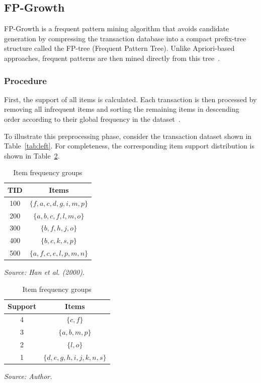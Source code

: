 \subsection{FP-Growth}

FP-Growth is a frequent pattern mining algorithm that avoids candidate generation by compressing the transaction database into a compact prefix-tree structure called the FP-tree (Frequent Pattern Tree). Unlike Apriori-based approaches, frequent patterns are then mined directly from this tree~\parencite{Han2000Mining}.

\subsubsection{Procedure}

First, the support of all items is calculated. Each transaction is then processed by removing all infrequent items and sorting the remaining items in descending order according to their global frequency in the dataset~\parencite{Han2000Mining}.

To illustrate this preprocessing phase, consider the transaction dataset shown in Table~\ref{tab:left}. For completeness, the corresponding item support distribution is shown in Table~\ref{tab:right}.

\begin{table}[h!]
\centering
\begin{minipage}{0.48\textwidth}
\centering
\caption{Transaction dataset}
\label{tab:left}
\begin{tabular}{|c|c|}
\hline
\textbf{TID} & \textbf{Items} \\
\hline
100 & $\{f, a, c, d, g, i, m, p\}$ \\
200 & $\{a, b, c, f, l, m, o\}$ \\
300 & $\{b, f, h, j, o\}$ \\
400 & $\{b, c, k, s, p\}$ \\
500 & $\{a, f, c, e, l, p, m, n\}$ \\
\hline
\end{tabular}
\vspace{0.2cm}
\parbox{0.9\textwidth}{\centering \textit{Source: Han et al. (2000).}}
\end{minipage}
\hfill
\begin{minipage}{0.48\textwidth}
\centering
\caption{Item frequency groups}
\label{tab:right}
\begin{tabular}{|c|c|}
\hline
\textbf{Support} & \textbf{Items} \\
\hline
4 & $\{c, f\}$ \\
3 & $\{a, b, m, p\}$ \\
2 & $\{l, o\}$ \\
1 & $\{d, e, g, h, i, j, k, n, s\}$ \\
\hline
\end{tabular}
\vspace{0.2cm}
\parbox{0.9\textwidth}{\centering \textit{Source: Author.}}
\end{minipage}
\end{table}

